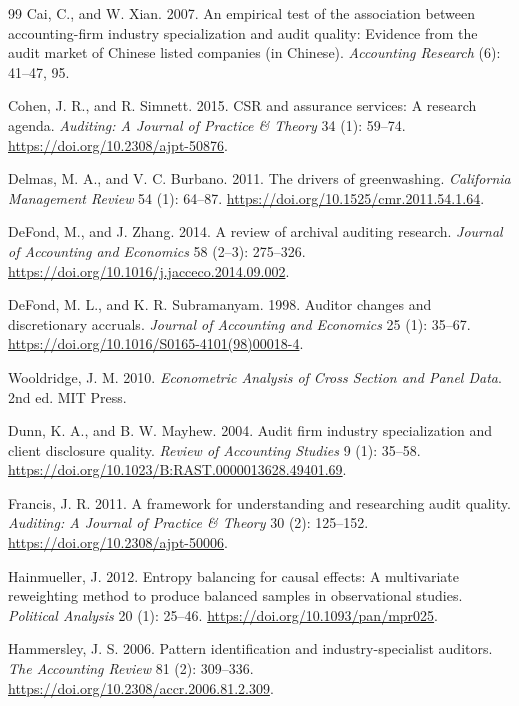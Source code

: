 \documentclass[11pt]{article}
\begin{document}
\begin{thebibliography}{99}
Cai, C., and W. Xian. 2007.
An empirical test of the association between accounting-firm industry specialization and audit quality: Evidence from the audit market of Chinese listed companies (in Chinese).
\textit{Accounting Research} (6): 41--47, 95.

Cohen, J. R., and R. Simnett. 2015.
CSR and assurance services: A research agenda.
\textit{Auditing: A Journal of Practice \& Theory} 34 (1): 59--74. \url{https://doi.org/10.2308/ajpt-50876}.

Delmas, M. A., and V. C. Burbano. 2011.
The drivers of greenwashing.
\textit{California Management Review} 54 (1): 64--87. \url{https://doi.org/10.1525/cmr.2011.54.1.64}.

DeFond, M., and J. Zhang. 2014.
A review of archival auditing research.
\textit{Journal of Accounting and Economics} 58 (2--3): 275--326. \url{https://doi.org/10.1016/j.jacceco.2014.09.002}.

DeFond, M. L., and K. R. Subramanyam. 1998.
Auditor changes and discretionary accruals.
\textit{Journal of Accounting and Economics} 25 (1): 35--67. \url{https://doi.org/10.1016/S0165-4101(98)00018-4}.

Wooldridge, J. M. 2010.
\textit{Econometric Analysis of Cross Section and Panel Data}. 2nd ed. MIT Press.

Dunn, K. A., and B. W. Mayhew. 2004.
Audit firm industry specialization and client disclosure quality.
\textit{Review of Accounting Studies} 9 (1): 35--58. \url{https://doi.org/10.1023/B:RAST.0000013628.49401.69}.

Francis, J. R. 2011.
A framework for understanding and researching audit quality.
\textit{Auditing: A Journal of Practice \& Theory} 30 (2): 125--152. \url{https://doi.org/10.2308/ajpt-50006}.

Hainmueller, J. 2012.
Entropy balancing for causal effects: A multivariate reweighting method to produce balanced samples in observational studies.
\textit{Political Analysis} 20 (1): 25--46. \url{https://doi.org/10.1093/pan/mpr025}.

Hammersley, J. S. 2006.
Pattern identification and industry-specialist auditors.
\textit{The Accounting Review} 81 (2): 309--336. \url{https://doi.org/10.2308/accr.2006.81.2.309}.


\end{thebibliography}
\end{document}
